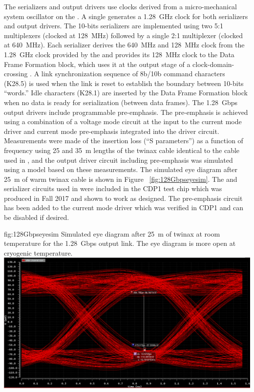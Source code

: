 The serializers and output drivers use clocks derived from a micro-mechanical
system oscillator on the . A single  generates a 
\SI{1.28}{GHz} clock for both serializers and output drivers. The 10-bits 
serializers are implemented using two 5:1 multiplexers (clocked at \SI{128}{MHz}) 
followed by a single 2:1 multiplexer (clocked at \SI{640}{MHz}). Each serializer 
derives the \SI{640}{MHz} and \SI{128}{MHz} clock from the \SI{1.28}{GHz} 
clock provided by the  and provides its \SI{128}{MHz} clock to 
the Data Frame Formation block, which uses it at the output stage of a 
clock-domain-crossing . A link synchronization sequence of 8b/10b 
command characters (K28.5) is used when the link is reset to establish the 
boundary between 10-bits ``words.'' Idle characters (K28.1) are inserted 
by the Data Frame Formation block when no data is ready for serialization 
(between data frames). The \SI{1.28}{Gbps} output drivers include programmable 
pre-emphasis. The pre-emphasis is achieved using a combination of a voltage 
mode circuit at the input to the current mode driver and current mode 
pre-emphasis integrated into the driver circuit. Measurements were made 
of the insertion loss (``S parameters'') as a function of frequency using
\num{25} and \SI{35}{m} lengths of the twinax cable identical to the 
cable used in , and the output driver circuit including 
pre-emphasis was simulated using a  model based on these 
measurements. The simulated eye diagram after \SI{25}{m} of warm twinax 
cable is shown in Figure ~\ref{fig:128Gbpseyesim}. The  and 
serializer circuits used in  were included in the CDP1 
test chip which was produced in Fall 2017 and shown to work as designed. 
The pre-emphasis circuit has been added to the current mode driver which 
was verified in CDP1 and can be disabled if desired. 

\begin{dunefigure}
{fig:128Gbpseyesim}
{Simulated eye diagram after \SI{25}{m} of  twinax at room 
temperature for the  \SI{1.28}{Gbps} output link.  
The eye diagram is more open at cryogenic temperature.}
\includegraphics[width=0.8\linewidth]{graphics/coldata_128Gbpseyesim.png}
\end{dunefigure}

